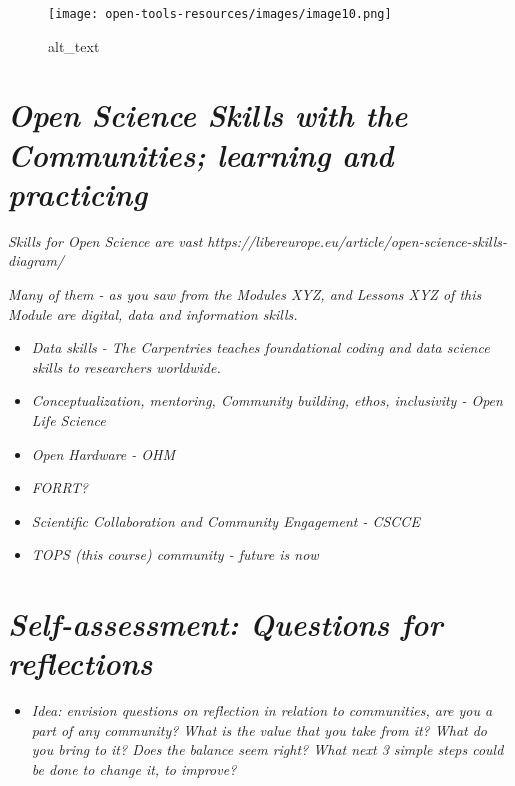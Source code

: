 \documentclass[
  letterpaper,
  DIV=11,
  numbers=noendperiod]{scrreport}
\providecommand{\tightlist}{%
  \setlength{\itemsep}{0pt}\setlength{\parskip}{0pt}}\usepackage{longtable,booktabs,array}
\begin{document}
\begin{figure}

{\centering \texttt{[image: open-tools-resources/images/image10.png]}

}

\caption{alt\_text}

\end{figure}

\hypertarget{open-science-skills-with-the-communities-learning-and-practicing}{%
\section{\texorpdfstring{\emph{Open Science Skills with the Communities;
learning and
practicing}}{Open Science Skills with the Communities; learning and practicing}}\label{open-science-skills-with-the-communities-learning-and-practicing}}

\emph{Skills for Open Science are vast
https://libereurope.eu/article/open-science-skills-diagram/ }

\emph{Many of them - as you saw from the Modules XYZ, and Lessons XYZ of
this Module are digital, data and information skills. }

\begin{itemize}
\tightlist
\item
  \emph{Data skills - The Carpentries teaches foundational coding and
  data science skills to researchers worldwide.}
\item
  \emph{Conceptualization, mentoring, Community building, ethos,
  inclusivity - Open Life Science}
\item
  \emph{Open Hardware - OHM}
\item
  \emph{FORRT?}
\item
  \emph{Scientific Collaboration and Community Engagement - CSCCE}
\item
  \emph{TOPS (this course) community - future is now}
\end{itemize}

\hypertarget{self-assessment-questions-for-reflections}{%
\section{\texorpdfstring{\emph{Self-assessment: Questions for
reflections}}{Self-assessment: Questions for reflections}}\label{self-assessment-questions-for-reflections}}

\begin{itemize}
\tightlist
\item
  \emph{Idea: envision questions on reflection in relation to
  communities, are you a part of any community? What is the value that
  you take from it? What do you bring to it? Does the balance seem
  right? What next 3 simple steps could be done to change it, to
  improve?}
\end{itemize}
\end{document}
